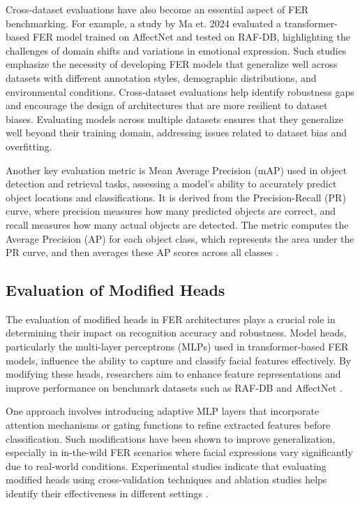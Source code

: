 Cross-dataset evaluations have also become an essential aspect of FER benchmarking. For example, a study by Ma et. 2024 \cite{ma_facial_2023} evaluated a transformer-based FER model trained on AffectNet and tested on RAF-DB, highlighting the challenges of domain shifts and variations in emotional expression. Such studies emphasize the necessity of developing FER models that generalize well across datasets with different annotation styles, demographic distributions, and environmental conditions. Cross-dataset evaluations help identify robustness gaps and encourage the design of architectures that are more resilient to dataset biases. Evaluating models across multiple datasets ensures that they generalize well beyond their training domain, addressing issues related to dataset bias and overfitting. 

Another key evaluation metric is Mean Average Precision (mAP)  used in object detection and retrieval tasks, assessing a model’s ability to accurately predict object locations and classifications. It is derived from the Precision-Recall (PR) curve, where precision measures how many predicted objects are correct, and recall measures how many actual objects are detected. The metric computes the Average Precision (AP) for each object class, which represents the area under the PR curve, and then averages these AP scores across all classes\cite{marcu_pitfalls_2022} \cite{ranjan_light-weight_2018}.

\subsection{Evaluation of Modified Heads}

The evaluation of modified heads in FER architectures plays a crucial role in determining their impact on recognition accuracy and robustness. Model heads, particularly the multi-layer perceptrons (MLPs) used in transformer-based FER models, influence the ability to capture and classify facial features effectively. By modifying these heads, researchers aim to enhance feature representations and improve performance on benchmark datasets such as RAF-DB and AffectNet \cite{zheng_poster_2022}.

One approach involves introducing adaptive MLP layers that incorporate attention mechanisms or gating functions to refine extracted features before classification. Such modifications have been shown to improve generalization, especially in in-the-wild FER scenarios where facial expressions vary significantly due to real-world conditions. Experimental studies indicate that evaluating modified heads using cross-validation techniques and ablation studies helps identify their effectiveness in different settings \cite{abdullah_activator_2024}.

